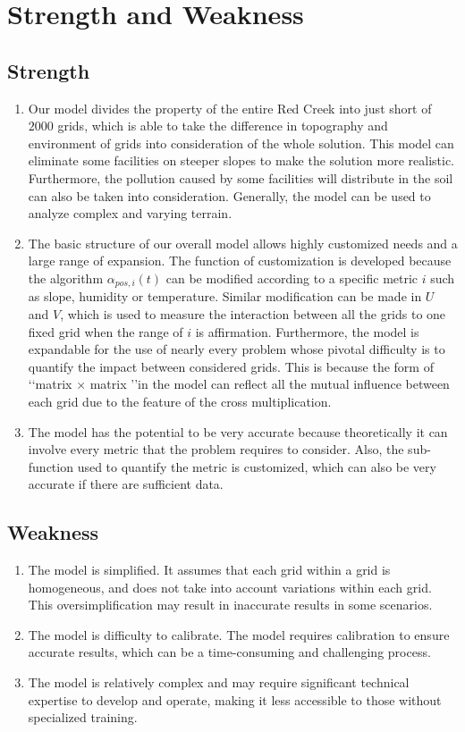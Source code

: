 \documentclass[./main.tex]{subfiles}
\begin{document}
    \section{Strength and Weakness}
    \subsection{Strength}
    \begin{enumerate}
        \item Our model divides the property of the entire Red Creek into just short of $2000$ grids, which is able to take
        the difference in topography and environment of grids into consideration of the whole solution.
        This model can eliminate some facilities on steeper slopes to make the solution more realistic.
        Furthermore, the pollution caused by some facilities will distribute in the soil can also be taken into
        consideration.
        Generally, the model can be used to analyze complex and varying terrain.
        \item The basic structure of our overall model allows highly customized needs and a large range of expansion.
        The function of customization is developed because the algorithm $\alpha_{pos, i}\left ( t \right )$ can be
        modified according to a specific metric $i$ such as slope, humidity or temperature.
        Similar modification can be made in $U$ and $V$, which is used to measure the interaction between all the grids to one fixed grid when the range of $i$ is affirmation.
        Furthermore, the model is expandable for the use of nearly every problem whose pivotal difficulty is
         to quantify the impact between considered grids.
        This is because the form of \lq\lq{matrix $\times$ matrix
        }\rq\rq in the model can reflect all the mutual influence between each grid due to the feature of the
        cross multiplication.
        \item The model has the potential to be very accurate because theoretically it can involve every metric that
        the problem requires to consider.
        Also, the sub-function used to quantify the metric is customized, which can also be very
        accurate if there are sufficient data.
    \end{enumerate}
    \subsection{Weakness}
    \begin{enumerate}
        \item The model is simplified.
        It assumes that each grid within a grid is homogeneous, and does not take into account variations within each grid.
        This oversimplification may result in inaccurate results in some scenarios.
        \item The model is difficulty to calibrate.
        The model requires calibration to ensure accurate results, which can be a time-consuming and challenging process.
        \item The model is relatively complex and may require significant technical expertise to develop and operate, making it less accessible to those without specialized training.
    \end{enumerate}
\end{document}
